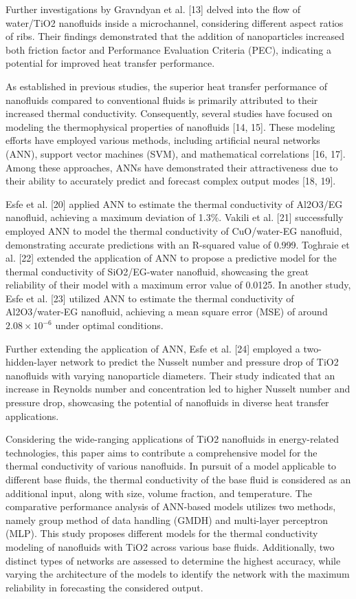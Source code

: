 \documentclass{article}
\begin{document}
Further investigations by Gravndyan et al. [13] delved into the flow of water/TiO2 nanofluids inside a microchannel, considering different aspect ratios of ribs. Their findings demonstrated that the addition of nanoparticles increased both friction factor and Performance Evaluation Criteria (PEC), indicating a potential for improved heat transfer performance.

As established in previous studies, the superior heat transfer performance of nanofluids compared to conventional fluids is primarily attributed to their increased thermal conductivity. Consequently, several studies have focused on modeling the thermophysical properties of nanofluids [14, 15]. These modeling efforts have employed various methods, including artificial neural networks (ANN), support vector machines (SVM), and mathematical correlations [16, 17]. Among these approaches, ANNs have demonstrated their attractiveness due to their ability to accurately predict and forecast complex output modes [18, 19].

Esfe et al. [20] applied ANN to estimate the thermal conductivity of Al2O3/EG nanofluid, achieving a maximum deviation of 1.3\%. Vakili et al. [21] successfully employed ANN to model the thermal conductivity of CuO/water-EG nanofluid, demonstrating accurate predictions with an R-squared value of 0.999. Toghraie et al. [22] extended the application of ANN to propose a predictive model for the thermal conductivity of SiO2/EG-water nanofluid, showcasing the great reliability of their model with a maximum error value of 0.0125. In another study, Esfe et al. [23] utilized ANN to estimate the thermal conductivity of Al2O3/water-EG nanofluid, achieving a mean square error (MSE) of around \(2.08 \times 10^{-6}\) under optimal conditions.

Further extending the application of ANN, Esfe et al. [24] employed a two-hidden-layer network to predict the Nusselt number and pressure drop of TiO2 nanofluids with varying nanoparticle diameters. Their study indicated that an increase in Reynolds number and concentration led to higher Nusselt number and pressure drop, showcasing the potential of nanofluids in diverse heat transfer applications.

Considering the wide-ranging applications of TiO2 nanofluids in energy-related technologies, this paper aims to contribute a comprehensive model for the thermal conductivity of various nanofluids. In pursuit of a model applicable to different base fluids, the thermal conductivity of the base fluid is considered as an additional input, along with size, volume fraction, and temperature. The comparative performance analysis of ANN-based models utilizes two methods, namely group method of data handling (GMDH) and multi-layer perceptron (MLP). This study proposes different models for the thermal conductivity modeling of nanofluids with TiO2 across various base fluids. Additionally, two distinct types of networks are assessed to determine the highest accuracy, while varying the architecture of the models to identify the network with the maximum reliability in forecasting the considered output.
\end{document}
